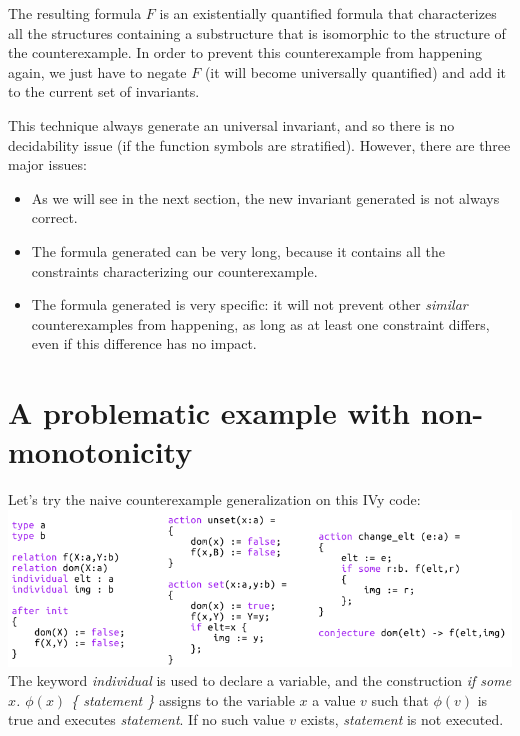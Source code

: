 \documentclass[11pt,a4paper,oldfontcommands,openany]{memoir}
\begin{document}
    The resulting formula \(F\) is an existentially quantified formula that characterizes all the structures containing a substructure that is isomorphic to the structure of the counterexample.
    In order to prevent this counterexample from happening again, we just have to negate \(F\) (it will become universally quantified) and add it to the current set of invariants.

    This technique always generate an universal invariant, and so there is no decidability issue (if the function symbols are stratified).
    However, there are three major issues:
    \begin{itemize}
        \item As we will see in the next section, the new invariant generated is not always correct.
        \item The formula generated can be very long, because it contains all the constraints characterizing our counterexample.
        \item The formula generated is very specific: it will not prevent other \textit{similar} counterexamples from happening, as long as
        at least one constraint differs, even if this difference has no impact.
    \end{itemize}

    \section{A problematic example with non-monotonicity}

    Let's try the naive counterexample generalization on this IVy code:\\

    \includegraphics[width=15cm]{NonMonotonicExLarge}
    \\
    The keyword \textit{individual} is used to declare a variable, and the construction \textit{if some \(x\). \(\phi(x)\) \{ statement \}}
    assigns to the variable \(x\) a value \(v\) such that \(\phi(v)\) is true and executes \textit{statement}. If no such value \(v\) exists,
    \textit{statement} is not executed.
\end{document}
